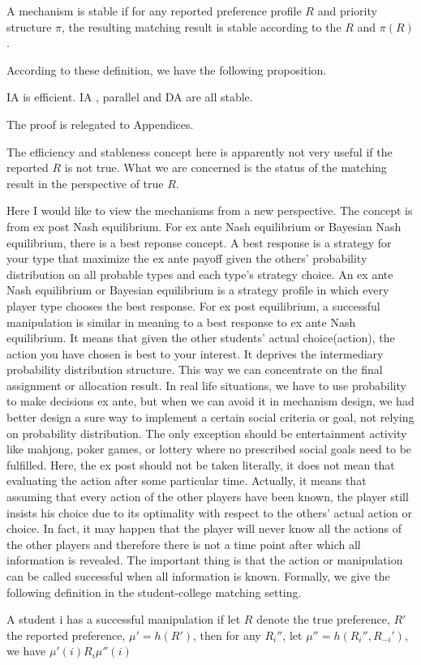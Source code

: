 \begin{definition}
A mechanism is stable if for any reported preference profile $R$ and
priority structure $\pi$, the resulting matching result is stable according to the $R$ and $\pi(R)$.
\end{definition}

According to these definition, we have the following proposition.

\begin{prop}
IA is efficient. IA , parallel and DA are all stable.
\end{prop}

The proof is relegated to Appendices.

\begin{remark}
The efficiency and stableness concept here is apparently not very useful if
the reported $R$ is not true. What we are concerned is the status of the matching
result in the perspective of true $R$.
\end{remark}

Here I would like to view the mechanisms from a new perspective. The concept is from ex post Nash equilibrium. For ex ante Nash equilibrium or Bayesian Nash equilibrium, there is a  best reponse concept.
A best response is a strategy for your type that maximize the ex ante payoff given the others' probability distribution on all probable types and each type's strategy choice. An ex ante Nash equilibrium or
Bayesian equilibrium is a strategy profile in which every player type chooses the best response. 
For ex post equilibrium,  a successful manipulation is similar in meaning to a best response to  ex ante Nash equilibrium. It means that given the other students' actual choice(action), the action you have
chosen is best to your interest. It deprives the intermediary probability distribution structure. This way we can concentrate on the final assignment or allocation result. In real life situations, 
we have to use probability to make decisions ex ante, but when we can avoid it in mechanism design, we had better design a sure way to implement a certain social criteria or goal, not relying on 
probability distribution. The only exception should be entertainment activity like mahjong, poker games, or lottery where no prescribed social goals need to be fulfilled. Here, the ex post should not be taken 
literally, it does not mean that 
evaluating the action after some particular time. Actually, it means that assuming that every action of the other players have been known, the player still insists his choice due to its optimality with respect
to the others' actual action or choice. In fact, it may happen that the player will never know all the actions of the other players and therefore there is not a time point after which all information is revealed. 
The important thing is that the action or manipulation can be called successful when all information is known.
Formally, we give the following definition in the student-college matching setting. 
\begin{definition}
A student i has a successful manipulation 
if let $R$ denote the true preference, $R'$ the reported preference, $\mu' = h(R')$, then for any $R_i''$, let $\mu''= h(R_i'',R_{-i}')$, we have  $\mu'(i) R_i \mu''(i)$
\end{definition}

